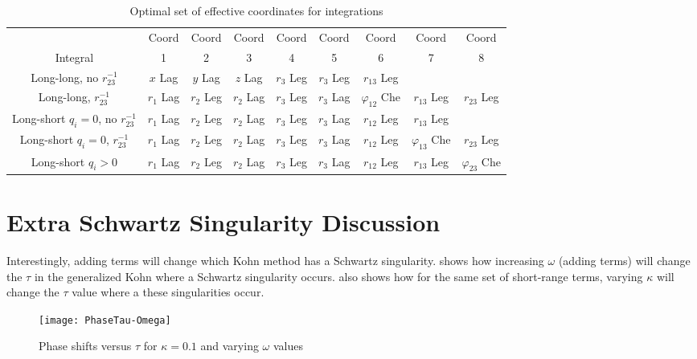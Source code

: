 \documentclass[Dissertation.tex]{subfiles}
\begin{document}
\begin{table}
\centering
\footnotesize
\begin{tabular}{c c c c c c c c c}
\toprule
 & Coord & Coord & Coord & Coord & Coord & Coord & Coord & Coord \\
Integral & 1 & 2 & 3 & 4 & 5 & 6 & 7 & 8 \\
\midrule
 Long-long, no $r_{23}^{-1}$ & $x$ Lag & $y$ Lag & $z$ Lag & $r_3$ Leg & $r_3$ Leg & $r_{13}$ Leg & & \\
 Long-long, $r_{23}^{-1}$ & $r_1$ Lag & $r_2$ Leg & $r_2$ Lag & $r_3$ Leg & $r_3$ Lag & $\varphi_{12}$ Che & $r_{13}$ Leg & $r_{23}$ Leg \\
\midrule
 Long-short $q_i = 0$, no $r_{23}^{-1}$ & $r_1$ Lag & $r_2$ Leg & $r_2$ Lag & $r_3$ Leg & $r_3$ Lag & $r_{12}$ Leg & $r_{13}$ Leg & \\
 Long-short $q_i = 0$, $r_{23}^{-1}$ & $r_1$ Lag & $r_2$ Leg & $r_2$ Lag & $r_3$ Leg & $r_3$ Lag & $r_{12}$ Leg & $\varphi_{13}$ Che & $r_{23}$ Leg \\
 Long-short $q_i > 0$ & $r_1$ Lag & $r_2$ Leg & $r_2$ Lag & $r_3$ Leg & $r_3$ Lag & $r_{12}$ Leg & $r_{13}$ Leg & $\varphi_{23}$ Che \\
\bottomrule
\end{tabular}
\caption{Optimal set of effective coordinates for integrations}
\label{tab:EffectiveCoords}
\end{table}


\section{Extra Schwartz Singularity Discussion}
\label{sec:ExtraSchwartz}

Interestingly, adding terms will change which Kohn method has a Schwartz 
singularity.  shows how increasing $\omega$ (adding 
terms) will change the $\tau$ in the generalized Kohn where a Schwartz 
singularity occurs.  also shows how for the 
same set of short-range terms, varying $\kappa$ will change the $\tau$ value 
where a these singularities occur.

\begin{figure}
	\centering
	\texttt{[image: PhaseTau-Omega]}
	\caption{Phase shifts versus $\tau$ for $\kappa = 0.1$ and varying $\omega$ values}
	\label{fig:PhaseTau-Omega}
\end{figure}
\end{document}
